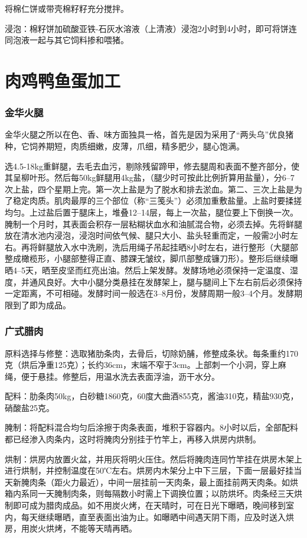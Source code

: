 \documentclass{ctexbook}
\begin{document}
将棉仁饼或带壳棉籽籽充分搅拌。

浸泡：棉籽饼加硫酸亚铁-石灰水溶液（上清液）浸泡2小时到4小时，即可将饼连同泡液一起与其它饲料掺和喂猪。

\chapter{肉鸡鸭鱼蛋加工}
\subsection{金华火腿}
金华火腿之所以在色、香、味方面独具一格，首先是因为采用了“两头乌”优良猪种，它饲养期短，肉质细嫩，皮薄，爪细，精多肥少，腿心饱满。

选4.5-18kg重鲜腿，去毛去血污，剔除残留蹄甲，修去腿周和表面不整齐部分，使其呈柳叶形。然后每50kg鲜腿用4kg盐，（腿少时可按此比例折算用盐量），分6--7次上盐，四个星期上完。第一次上盐是为了脱水和排去淤血。第二、三次上盐是为了稳定肉质。肌肉最厚的三个部位（称“三笺头”）必须加重敷盐量。上盐时要揉搓均匀。上过盐后置于腿床上，堆叠12--14层，每上一次盐，腿位要上下倒换一次。腌制一个月时，其表面会积存一层粘糊状血水和油腻混合物，必须去掉。先将鲜腿放在清水池内浸泡，浸泡时间依气候、腿只大小、盐头轻重而定，一般需2小时左右。再将鲜腿放入水中洗刷，洗后用绳子吊起挂晒8小时左右，进行整形（大腿部整成橄榄形，小腿部整得正直、膝踝无皱纹，脚爪部整成镰刀形）。整形后继续曝晒4--5天，晒至皮坚而红亮出油。然后上架发酵。发酵场地必须保持一定温度、湿度，并通风良好。大中小腿分类悬挂在发酵架上，腿与腿间上下左右前后必须保持一定距离，不可相碰。发酵时间一般选在3--8月份，发酵周期一般3--4个月。发酵期限到了即为成品。
\subsection{广式腊肉}
原料选择与修整：选取猪肋条肉，去骨后，切除奶脯，修整成条状。每条重约170克（烘后净重125克）；长约36cm，末端不窄于3cm。上部刺一个小洞，穿上麻绳，便于悬挂。修整后，用温水洗去表面浮油，沥干水分。

配料：肋条肉50kg，白砂糖1860克，60度大曲酒855克，酱油310克，精盐930克，硝酸盐25克。

腌制：将配料混合均匀后涂擦于肉条表面，堆积于容器内。8小时以后，全部配料都已经渗入肉条内，这时将腌肉分别挂于竹竿上，再移入烘房内烘制。

烘制：烘房内放置火盆，并用灰将明火压住。然后将腌肉连同竹竿挂在烘房木架上进行烘制，并控制温度在50℃左右。烘房内木架分上中下三层，下面一层最好挂当天新腌肉条（距火力最近），中间一层挂前一天肉条，最上面挂前两天肉条。如烘箱内系同一天腌制肉条，则每隔数小时需上下调换位置；以防烘坏。肉条经三天烘制即可成为腊肉成品。如不用炭火烤，在天晴时，可在日光下曝晒，晚间移到室内，每天继续曝晒，直至表面出油为止。如曝晒中间遇天阴下雨，应及时送入烘房，用炭火烘烤，不能等天晴再晒。
\end{document}
